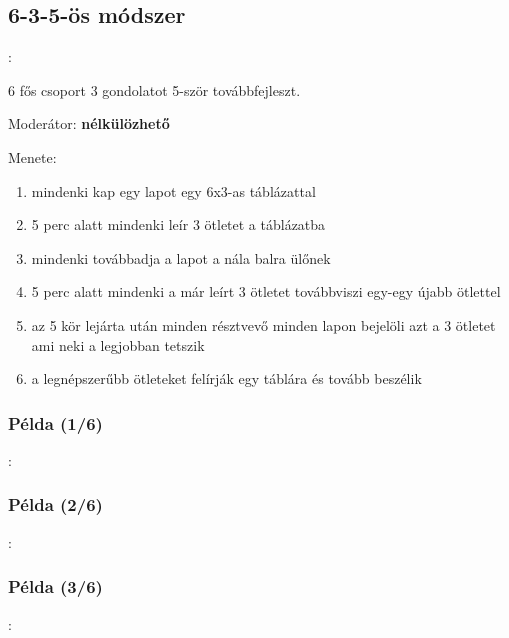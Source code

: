\documentclass{beamer}
\begin{document}
\subsection{6-3-5-ös módszer}
\begin{frame}{\secname : \subsecname}

6 fős csoport 3 gondolatot 5-ször továbbfejleszt.

Moderátor: \textbf{nélkülözhető}

Menete:
\begin{enumerate}
    \item mindenki kap egy lapot egy 6x3-as táblázattal
    \item 5 perc alatt mindenki leír 3 ötletet a táblázatba
    \item mindenki továbbadja a lapot a nála balra ülőnek
    \item 5 perc alatt mindenki a már leírt 3 ötletet továbbviszi egy-egy újabb ötlettel
    \item az 5 kör lejárta után minden résztvevő minden lapon bejelöli azt a 3 ötletet ami neki a legjobban tetszik
    \item a legnépszerűbb ötleteket felírják egy táblára és tovább beszélik
\end{enumerate}

\end{frame}

\subsubsection*{Példa (1/6)}
\begin{frame}{\subsecname : \subsubsecname}
    
\end{frame}

\subsubsection*{Példa (2/6)}
\begin{frame}{\subsecname : \subsubsecname}
    
\end{frame}

\subsubsection*{Példa (3/6)}
\begin{frame}{\subsecname : \subsubsecname}
    
\end{frame}
\end{document}

